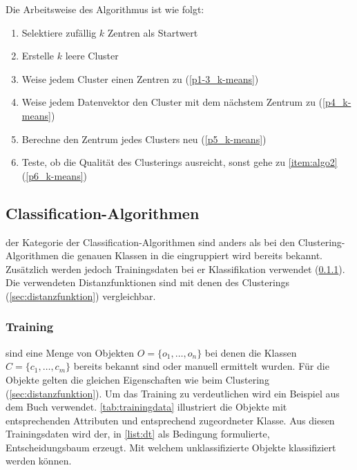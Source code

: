 \documentclass[12pt,journal,compsoc,ngerman]{IEEEtran}
\begin{document}
Die Arbeitsweise des Algorithmus ist wie folgt:
\begin{enumerate}
\item Selektiere zufällig $k$ Zentren als Startwert
\item Erstelle $k$ leere Cluster \label{item:algo2}
\item Weise jedem Cluster einen Zentren zu (\cref{p1-3_k-means})
\item Weise jedem Datenvektor den Cluster mit dem nächstem Zentrum zu (\cref{p4_k-means})
\item Berechne den Zentrum jedes Clusters neu (\cref{p5_k-means})
\item Teste, ob die Qualität des Clusterings ausreicht, sonst gehe zu \cref{item:algo2} (\cref{p6_k-means})
\end{enumerate}


 \subsection{Classification-Algorithmen}
  der Kategorie der Classification-Algorithmen sind anders 
 als bei den Clustering-Algorithmen die genauen Klassen in die 
 eingruppiert wird bereits bekannt. Zusätzlich werden jedoch Trainingsdaten bei er Klassifikation verwendet (\cref{sec:training}). 
 Die verwendeten Distanzfunktionen sind mit denen des Clusterings (\cref{sec:distanzfunktion}) vergleichbar.
 
 \subsubsection{Training}\label{sec:training}
  sind eine Menge von Objekten $O = \{o_1, \ldots, o_n\}$
 bei denen die Klassen $C = \{c_1, \ldots, c_m\}$ bereits bekannt sind oder manuell 
 ermittelt wurden. Für die Objekte gelten die gleichen Eigenschaften wie beim Clustering 
 (\cref{sec:distanzfunktion}). Um das Training zu verdeutlichen wird ein Beispiel 
 aus dem Buch \cite{ester2000knowledge} verwendet.  
 \cref{tab:trainingdata} illustriert die Objekte mit entsprechenden Attributen und entsprechend zugeordneter Klasse. 
 Aus diesen Trainingsdaten wird der, in \cref{list:dt} als Bedingung formulierte, Entscheidungsbaum
 erzeugt. Mit welchem unklassifizierte Objekte klassifiziert werden können. 
\end{document}
